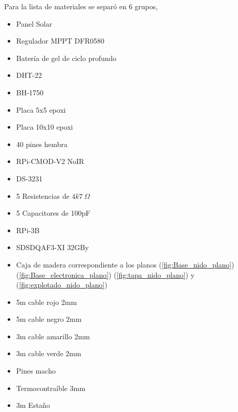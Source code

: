 Para la lista de materiales se separó en 6 grupos, 
\begin{itemize}

\item Panel Solar \TBD
\item Regulador MPPT DFR0580
\item Bater\'ia de gel de ciclo profundo \TBD
\end{itemize}
\begin{itemize}
\item DHT-22 
\item BH-1750
\item Placa 5x5 epoxi
\item Placa 10x10 epoxi
\item 40 pines hembra
\item RPi-CMOD-V2 NoIR
\item DS-3231
\item 5 Resistencias de $4k7 \ \Omega$ 
\item 5 Capacitores de 100pF
\end{itemize}
\begin{itemize}
\item RPi-3B
\item SDSDQAF3-XI 32GBy
\end{itemize}


\begin{itemize}

\item Caja de madera correspondiente a los planos (\ref{fig:Base_nido_plano}) (\ref{fig:Base_electronica_plano}) (\ref{fig:tapa_nido_plano}) y (\ref{fig:explotado_nido_plano})


\end{itemize}
\begin{itemize}
\item 5m cable rojo 2mm
\item 5m cable negro 2mm
\item 3m cable amarillo 2mm
\item 3m cable verde 2mm
\item Pines macho
\item Termocontra\'ible 3mm
\item 3m Estaño

\end{itemize}









